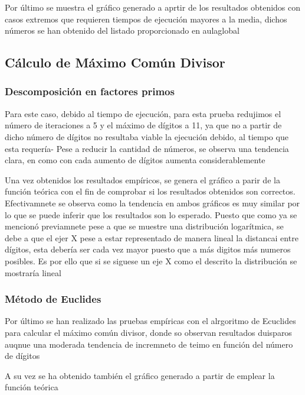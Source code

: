 Por último se muestra el gráfico generado a aprtir de los resultados obtenidos con casos extremos que requieren tiempos de ejecución mayores a la media, dichos números se han obtenido del listado proporcionado en aulaglobal
\begin{figure}[H]
\end{figure}




\subsection{Cálculo de Máximo Común Divisor}

\subsubsection{Descomposición en factores primos}
Para este caso, debido al tiempo de ejecución, para esta prueba redujimos el número de iteraciones a 5 y el máximo de dígitos a 11, ya que no a partir de dicho número de dígitos no resultaba viable la ejecución debido, al tiempo que esta requería- Pese a reducir la cantidad de números, se observa una tendencia clara, en como con cada aumento de dígitos aumenta considerablemente 
\begin{figure}[H]
\end{figure}

Una vez obtenidos los resultados empíricos, se genera el gráfico a parir de la función teórica con el fin de comprobar si los resultados obtenidos son correctos. Efectivamnete se observa como la tendencia en ambos gráficos es muy similar por lo que se puede inferir que los resultados son lo esperado. Puesto que como ya se mencionó previamnete pese a que se muestre una distribución logarítmica, se debe a que el ejer X pese a estar representado de manera lineal la distancai entre dígitos, esta debería ser cada vez mayor puesto que a más digitos más numeros posibles. Es por ello que si se siguese un eje X como el descrito la distribución se mostraría lineal
\begin{figure}[H]
\end{figure}



\subsubsection{Método de Euclides}
Por último se han realizado las pruebas empíricas con el alrgoritmo de Ecuclides para calcular el máximo común divisor, donde so observan resultados duisparos auqnue una moderada tendencia de incremneto de teimo en función del número de dígitos
\begin{figure}[H]
\end{figure}

A su vez se ha obtenido también el gráfico generado a partir de emplear la función teórica
\begin{figure}[H]
\end{figure}